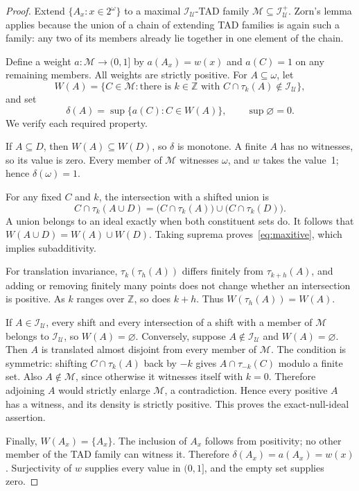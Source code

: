 \documentclass[11pt,a4paper]{article}
\theoremstyle{definition}
\theoremstyle{remark}
\newcommand{\I}{\mathcal I}
\newcommand{\U}{\mathcal U}
\newcommand{\M}{\mathcal M}
\newcommand{\sh}[2]{\tau_{#1}(#2)}
\begin{document}
\begin{proof}
Extend $\{A_x:x\in2^\omega\}$ to a maximal $\I_\U$-TAD family
$\M\subseteq\I_\U^+$. Zorn's lemma applies because the union of a chain
of extending TAD families is again such a family: any two of its
members already lie together in one element of the chain.

Define a weight $a:\M\to(0,1]$ by $a(A_x)=w(x)$ and $a(C)=1$ on any
remaining members. All weights are strictly positive. For
$A\subseteq\omega$, let
\[
 W(A)=\{C\in\M:\text{there is }k\in\mathbb Z
                         \text{ with }C\cap\sh{k}{A}\notin\I_\U\},
\]
and set
\begin{equation}
\label{eq:densityformula}
                    \delta(A)=\sup\{a(C):C\in W(A)\},
                        \qquad\sup\varnothing=0.
\end{equation}
We verify each required property.

If $A\subseteq D$, then $W(A)\subseteq W(D)$, so $\delta$ is monotone.
A finite $A$ has no witnesses, so its value is zero. Every member of
$\M$ witnesses $\omega$, and $w$ takes the value~1; hence
$\delta(\omega)=1$.

For any fixed $C$ and $k$, the intersection with a shifted union is
\[
 C\cap\sh{k}{A\cup D}
       =\bigl(C\cap\sh{k}{A}\bigr)
                         \cup\bigl(C\cap\sh{k}{D}\bigr).
\]
A union belongs to an ideal exactly when both constituent sets do.
It follows that $W(A\cup D)=W(A)\cup W(D)$.
Taking suprema proves~\eqref{eq:maxitive}, which implies subadditivity.

For translation invariance, $\sh{k}{\sh{h}{A}}$ differs finitely from
$\sh{k+h}{A}$, and adding or removing finitely many points does not
change whether an intersection is positive. As $k$ ranges over
$\mathbb Z$, so does $k+h$. Thus $W(\sh{h}{A})=W(A)$.

If $A\in\I_\U$, every shift and every intersection of a shift with a
member of $\M$ belongs to $\I_\U$, so $W(A)=\varnothing$. Conversely,
suppose $A\notin\I_\U$ and $W(A)=\varnothing$. Then $A$ is translated
almost disjoint from every member of $\M$. The condition is symmetric:
shifting $C\cap\sh{k}{A}$ back by $-k$ gives
$A\cap\sh{-k}{C}$ modulo a finite set. Also $A\notin\M$, since otherwise
it witnesses itself with $k=0$. Therefore adjoining $A$ would strictly
enlarge $\M$, a contradiction. Hence every positive $A$ has a witness,
and its density is strictly positive. This proves the exact-null-ideal
assertion.

Finally, $W(A_x)=\{A_x\}$. The inclusion of $A_x$ follows from
positivity; no other member of the TAD family can witness it. Therefore
$\delta(A_x)=a(A_x)=w(x)$. Surjectivity of $w$ supplies every value in
$(0,1]$, and the empty set supplies zero.
\end{proof}
\end{document}
